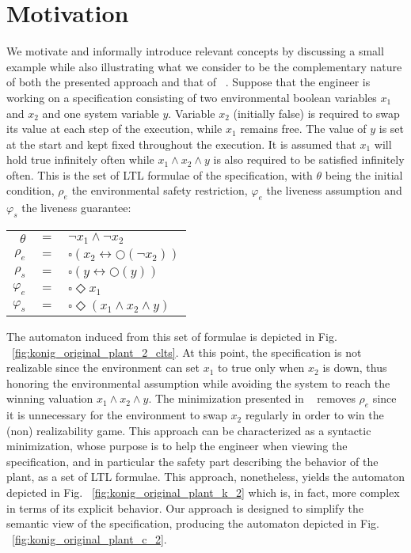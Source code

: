 \section{Motivation}\label{sec:motivation}
We motivate and informally introduce relevant concepts by discussing a small example while also illustrating what we consider to be the complementary nature 
of both the presented approach and that of ~\cite{DBLP:conf/hvc/KonighoferHB10}. Suppose that the engineer is working on a specification consisting of two environmental boolean variables $x_1$ and $x_2$ and one system variable $y$. Variable $x_2$ (initially false) is required to swap its value at each step of the execution, while $x_1$ remains free. The value of $y$ is set at the start and kept fixed throughout the execution.
It is assumed that $x_1$ will hold true infinitely often while $x_1 \wedge x_2 \wedge y$ is also required to be satisfied infinitely often. This is the set of LTL formulae of the specification, with $\theta$ being the initial condition, $\rho_e$ the environmental safety restriction, $\varphi_e$ the liveness assumption and $\varphi_s$ the liveness guarantee:
\begin{center}
	\begin{tabular}{ r c l }
		$\theta$& $=$ &$\neg x_1 \wedge \neg x_2$\\
		$\rho_e$& $=$ &$\square(x_2 \leftrightarrow \bigcirc(\neg x_2))$\\
		$\rho_s$& $=$ &$\square(y \leftrightarrow \bigcirc(y))$\\		
		$\varphi_e$& $=$ &$\square \Diamond x_1$\\
		$\varphi_s$& $=$ &$\square \Diamond (x_1 \wedge x_2 \wedge y)$\\
	\end{tabular}
\end{center}

The automaton induced from this set of formulae is depicted in Fig. ~\ref{fig:konig_original_plant_2_clts}. At this point, the specification is not realizable since the environment can set $x_1$ to true only when $x_2$ is down, thus honoring the environmental assumption while avoiding the system to reach the winning valuation $x_1 \wedge x_2 \wedge y$. The minimization presented in ~\cite{DBLP:conf/hvc/KonighoferHB10} removes $\rho_e$ since it is unnecessary for the environment to swap $x_2$ regularly in order to win the (non) realizability game. This approach can be characterized as a syntactic minimization, whose purpose is to help the engineer when viewing the specification, and in particular the safety part describing the behavior of the plant, as a set of LTL formulae. This approach, nonetheless, yields the automaton depicted in Fig. ~\ref{fig:konig_original_plant_k_2} which is, in fact, more complex in terms of its explicit behavior. Our approach is designed to simplify the semantic view of the specification, producing the automaton depicted in Fig. ~\ref{fig:konig_original_plant_c_2}. 

